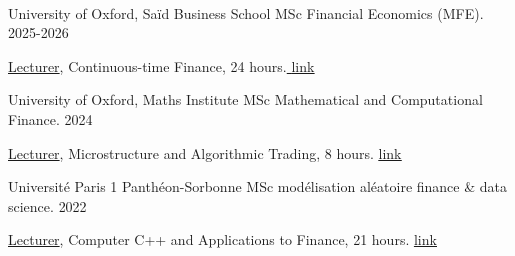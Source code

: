 \begin{center}
\\

\end{center}

\vspace{-1mm}
\begin{cvhonors}

  \cvhonor
    {University of Oxford, Saïd Business School} %
    {MSc Financial Economics (MFE).} %
    {} %
    {2025-2026} %
    
    \cvhonorrr
    {}
    {\underline{Lecturer}, Continuous-time Finance, 24 hours.\href{https://www.faycaldrissi.com/teaching/2024_ctf}{
    \color{teal}\underline{link}} }
    {}
    {}

    \cvhonor
    {University of Oxford, Maths Institute} %
    {MSc Mathematical and Computational Finance.} %
    {} %
    {2024} %
    
    \cvhonorrr
    {}
    {\underline{Lecturer}, Microstructure and Algorithmic Trading, 8 hours. \href{https://www.faycaldrissi.com/teaching/2023_hft}{
    \color{teal}\underline{link}}}
    {}
    {}
    
  
    \cvhonor
    {Université Paris 1 Panthéon-Sorbonne} %
    {MSc modélisation aléatoire finance \& data science.} %
    {} %
    {2022} %
    
    \cvhonorrr
    {}
    {\underline{Lecturer}, Computer C++ and Applications to Finance, 21 hours. \href{https://www.faycaldrissi.com/teaching/2022_Paris_cpp}{
    \color{teal}\underline{link}}}
    {}
    {}


\end{cvhonors}


